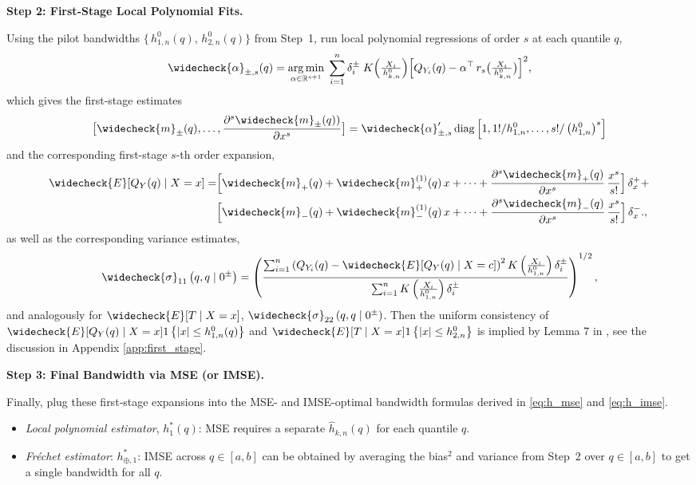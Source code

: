 \documentclass[12pt]{article}
\newcommand{\dpar}[2]{\frac{\partial #1}{\partial #2}}
\begin{document}
\medskip

\noindent
\textbf{Step 2: First‐Stage Local Polynomial Fits.}

Using the pilot bandwidths \(\{\,h_{1,n}^0(q),\,h_{2,n}^0(q)\}\) from Step~1, run local polynomial regressions of order \(s\) at each quantile $q$,
\[
\widecheck{\alpha}_{\pm,s}(q)
  =
  \underset{\alpha\in\mathbb{R}^{s+1}}{\arg\min}
  \;\sum_{i=1}^n
    \delta_{i}^{\pm}\;K\Bigl(\tfrac{X_i}{\,h_{k,n}^{0}}\Bigr)
      \Bigl[
         Q_{Y_i}(q)
         -
    \alpha^\top\,r_{s} \bigl(\tfrac{X_i}{\,h_{k,n}^{0}}\bigr)
      \Bigr]^2,
\]
which gives the first-stage estimates
\[ \bigl[\widecheck{m}_{\pm}(q),\dots,\dpar{^{s}\widecheck{m}_{\pm}(q))}{x^{s}}\bigr] = \widecheck{\alpha}_{\pm, s}^{\prime} \operatorname{diag}\left[1,1!/ h_{1, n}^0, \ldots, s!/\left(h_{1, n}^0\right)^s\right] \] and the corresponding first-stage $s$-th order expansion, 
$$\begin{aligned} \widecheck{E}[Q_Y(q) \mid X=x] = & 
\Bigl[
  \widecheck{m}_{+}(q)
  + \widecheck{m}_{+}^{(1)}(q)\,x
  + \cdots
  + \frac{\partial^{s}\widecheck{m}_{+}(q)}{\partial x^{s}}\,
    \frac{x^{s}}{s!}
\Bigr]
\,\delta_x^{+}
+ \\ 
& \Bigl[
  \widecheck{m}_{-}(q)
  + \widecheck{m}_{-}^{(1)}(q)\,x
  + \cdots
  + \frac{\partial^{s}\widecheck{m}_{-}(q)}{\partial x^{s}}\,
    \frac{x^{s}}{s!}
\Bigr]
\,\delta_x^{-}.
,\end{aligned}$$
as well as the corresponding variance estimates,
\[ \widecheck{\sigma}_{11}\left(q, q \mid 0^{ \pm}\right)=\left(\frac{\sum_{i=1}^n\left(Q_{Y_i}(q)-\widecheck{E}[Q_Y(q) \mid X=c] \right)^2 K\left(\frac{X_i}{h_{1, n}^0}\right) \delta_i^{ \pm}}{\sum_{i=1}^n K\left(\frac{X_i}{h^0_{1, n}}\right) \delta_i^{ \pm}}\right)^{1 / 2},
\]
and analogously for $\widecheck{E}[T \mid X=x]$, $ \widecheck{\sigma}_{22}\left(q, q \mid 0^{ \pm}\right)$. Then the uniform consistency of $\widecheck{E}[Q_Y(q) \mid X=x] \mathrm{1}\left\{|x| \leq h_{1, n}^0(q)\right\}$ and $\widecheck{E}[T \mid X=x] \mathrm{1}\left\{|x| \leq h_{2, n}^0\right\}$ is implied by Lemma 7 in \citet{chiang2019robust}, see the discussion in Appendix \ref{app:first_stage}. 

\medskip

\noindent
\textbf{Step 3: Final Bandwidth via MSE (or IMSE).}

Finally, plug these first‐stage expansions into the MSE- and IMSE-optimal bandwidth formulas derived in \eqref{eq:h_mse} and \eqref{eq:h_imse}. 

\begin{itemize}
\item \emph{Local polynomial estimator}, $h_{1}^*(q)$: MSE requires a separate \(\widehat{h}_{k,n}(q)\) for each quantile \(q\).  
\item \emph{Fr\'echet estimator}: $h_{\oplus,1}^*$: IMSE across \(q\in[a,b]\) can be obtained by averaging the bias$^2$ and variance from Step~2 over \(q\in[a,b]\) to get a single bandwidth for all $q$.   
\end{itemize}
\end{document}
